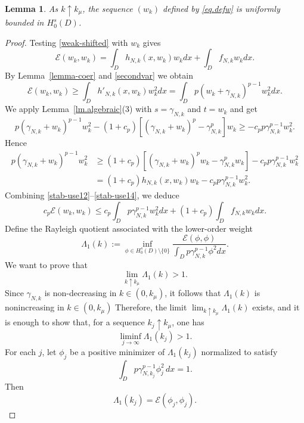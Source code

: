 \documentclass[11pt,a4paper,reqno]{amsart}
\newtheorem{lemma}[theorem]{\bf Lemma}
\theoremstyle{definition}
\numberwithin{equation}{section}
\begin{document}
\begin{lemma}\label{uniform_bound}
As $k \uparrow k_\mu$, the sequence $(w_k)$ defined by \eqref{eq.defw} is uniformly bounded in $H_0^s(D)$.
\end{lemma}
\begin{proof}
Testing \eqref{weak-shifted} with $w_k$ gives
\begin{equation}\label{stab-use12}
\mathcal E(w_k,w_k) = \int_D h_{N,k}(x, w_k)w_k dx + \int_D f_{N,k} w_k dx.
\end{equation}
By Lemma~\ref{lemma-coer}  and \eqref{secondvar} we obtain
\begin{equation}\label{stab-use13}
\mathcal E(w_k,w_k) \ge  \int_D h'_{N,k}(x, w_k) w_k^2 dx=\int_D p(w_k + \gamma_{N,k})^{p-1} w_k^2 dx.
\end{equation}
We apply Lemma~\ref{lm.algebraic}(3) with  $s= \gamma_{N,k}$ and $t = w_k$ and get
\[
p(\gamma_{N,k}+w_k)^{p-1}w_k^2 - (1+c_p)[(\gamma_{N,k}+w_k)^{p}-\gamma_{N,k}^p]w_k\ge -c_p p\gamma_{N,k}^{p-1}w_k^2.
\]
Hence
\begin{equation}\label{stab-use14}
\begin{split}
p(\gamma_{N,k}+w_k)^{p-1}w_k^2&\ge (1+c_p) \left[ (\gamma_{N,k}+w_k)^{p}w_k -\gamma_{N,k}^{p}w_k\right]  -  c_pp\gamma_{N,k}^{p-1}w_k^2
\\&=(1+c_p) h_{N,k}(x, w_k)w_k-  c_pp\gamma_{N,k}^{p-1}w_k^2.
\end{split}
\end{equation}
Combining \eqref{stab-use12}--\eqref{stab-use14}, we deduce
\begin{equation}
\label{eq.ee1}
c_p \mathcal E(w_k,w_k)  \le c_p \int_D p\gamma_{N,k}^{p-1} w_k^2 dx + (1+c_p)\int_D f_{N,k} w_k dx.
\end{equation}
Define the Rayleigh quotient associated with the lower-order weight
$$\Lambda_1(k) := \inf_{\phi \in H_0^s(D) \setminus \{0\}} \frac{\mathcal E(\phi,\phi)}{\int_D p\gamma_{N,k}^{p-1} \phi^2 dx}.$$
We want to prove that
\[
\lim_{k\uparrow k_\mu}\Lambda_{1}(k)>1.
\]
Since $\gamma_{N,k}$ is non-decreasing in  $k\in (0,k_\mu)$, it follows that 
$\Lambda_{1}(k)$ is nonincreasing in $k\in (0,k_\mu)$
Therefore, the limit $\lim_{k\uparrow k_\mu}\Lambda_{1}(k)$ exists, 
and it is enough to show that, for a sequence $k_{j}\uparrow k_\mu$, one has
\[
\liminf_{j\rightarrow\infty}\Lambda_{1}(k_{j})>1.
\]
For each $j$, let $\phi_{j}$ be a positive minimizer of $\Lambda_{1}(k_{j})$
normalized to satisfy
\[
\int_D p\gamma_{N,k_j}^{p-1} \phi^2_j\,dx=1.
\]
Then
\[
\Lambda_{1}(k_{j})=\mathcal{E}(\phi_{j},\phi_{j}).
\]
\end{proof}
\end{document}
